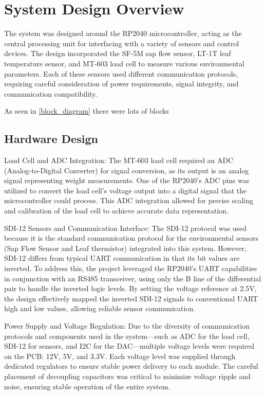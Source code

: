 
\section{System Design Overview}

The system was designed around the RP2040 microcontroller, acting as the central processing unit for interfacing with a variety of sensors and control devices. The design incorporated the SF-5M sap flow sensor, LT-1T leaf temperature sensor, and MT-603 load cell to measure various environmental parameters. Each of these sensors used different communication protocols, requiring careful consideration of power requirements, signal integrity, and communication compatibility.

As seen in \cref{block_diagram} there were lots of blocks

\subsection{Hardware Design}
Load Cell and ADC Integration: The MT-603 load cell required an ADC (Analog-to-Digital Converter) for signal conversion, as its output is an analog signal representing weight measurements. One of the RP2040's ADC pins was utilized to convert the load cell's voltage output into a digital signal that the microcontroller could process. This ADC integration allowed for precise scaling and calibration of the load cell to achieve accurate data representation.

SDI-12 Sensors and Communication Interface: The SDI-12 protocol was used because it is the standard communication protocol for the environmental sensors (Sap Flow Sensor and
Leaf thermistor) integrated into this system. However, SDI-12 differs from typical UART communication in that its bit values are inverted. To address this, the project leveraged the RP2040's UART capabilities in conjunction with an RS485 transceiver, using only the B line of the differential pair to handle the inverted logic levels. By setting the voltage reference at 2.5V, the design effectively mapped the inverted SDI-12 signals to conventional UART high and low values, allowing reliable sensor communication.

Power Supply and Voltage Regulation: Due to the diversity of communication protocols and components used in the system—such as ADC for the load cell, SDI-12 for sensors, and I2C for the DAC—multiple voltage levels were required on the PCB: 12V, 5V, and 3.3V. Each voltage level was supplied through dedicated regulators to ensure stable power delivery to each module. The careful placement of decoupling capacitors was critical to minimize voltage ripple and noise, ensuring stable operation of the entire system.

